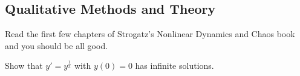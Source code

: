 \subsection{Qualitative Methods and Theory}

\begin{remark}
    Read the first few chapters of Strogatz's Nonlinear Dynamics and Chaos book and you should be all good.
\end{remark}

\begin{example}
    Show that $y' = y^{\frac{1}{3}}$ with $y(0) = 0$ has infinite solutions.
\end{example}